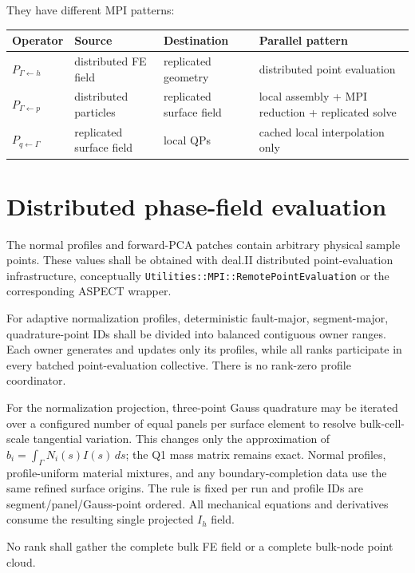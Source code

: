 \documentclass[11pt]{article}
\begin{document}
They have different MPI patterns:

\begin{center}
\begin{tabular}{llll}
\toprule
Operator & Source & Destination & Parallel pattern \\
\midrule
$P_{\Gamma\leftarrow h}$ & distributed FE field & replicated geometry & distributed point evaluation \\
$P_{\Gamma\leftarrow p}$ & distributed particles & replicated surface field & local assembly + MPI reduction + replicated solve \\
$P_{q\leftarrow\Gamma}$ & replicated surface field & local QPs & cached local interpolation only \\
\bottomrule
\end{tabular}
\end{center}

\section{Distributed phase-field evaluation}

The normal profiles and forward-PCA patches contain arbitrary physical sample points.  These values shall be obtained with deal.II distributed point-evaluation infrastructure, conceptually \texttt{Utilities::MPI::RemotePointEvaluation} or the corresponding ASPECT wrapper.

For adaptive normalization profiles, deterministic fault-major, segment-major,
quadrature-point IDs shall be divided into balanced contiguous owner ranges.
Each owner generates and updates only its profiles, while all ranks participate
in every batched point-evaluation collective. There is no rank-zero profile
coordinator.

For the normalization projection, three-point Gauss quadrature may be iterated
over a configured number of equal panels per surface element to resolve
bulk-cell-scale tangential variation. This changes only the approximation of
$b_i=\int_\Gamma N_i(s)I(s)\,ds$; the Q1 mass matrix remains exact.
Normal profiles, profile-uniform material mixtures, and any boundary-completion
data use the same refined surface origins. The rule is fixed per run and profile
IDs are segment/panel/Gauss-point ordered. All mechanical equations and
derivatives consume the resulting single projected $I_h$ field.

No rank shall gather the complete bulk FE field or a complete bulk-node point cloud.
\end{document}
